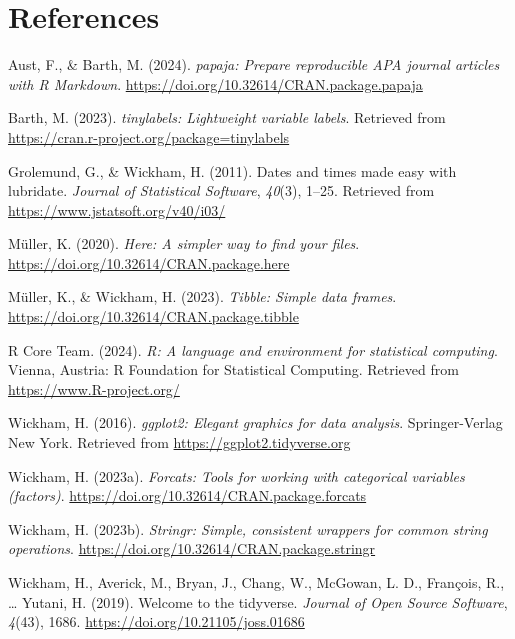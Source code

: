 \documentclass[
  ,man]{apa6}
\newlength{\cslhangindent}
\newenvironment{CSLReferences}[2] %
 {\begin{list}{}{%
  \setlength{\itemindent}{0pt}
  \setlength{\leftmargin}{0pt}
  \setlength{\parsep}{0pt}
  \ifodd #1
   \setlength{\leftmargin}{\cslhangindent}
   \setlength{\itemindent}{-1\cslhangindent}
  \fi
  \setlength{\itemsep}{#2\baselineskip}}}
 {\end{list}}
\begin{document}
\section{References}\label{references}

\setlength{\parindent}{-0.5in}
\setlength{\leftskip}{0.5in}

\label{refs}
\begin{CSLReferences}{1}{0}
Aust, F., \& Barth, M. (2024). \emph{{papaja}: {Prepare} reproducible {APA} journal articles with {R Markdown}}. \url{https://doi.org/10.32614/CRAN.package.papaja}

Barth, M. (2023). \emph{{tinylabels}: Lightweight variable labels}. Retrieved from \url{https://cran.r-project.org/package=tinylabels}

Grolemund, G., \& Wickham, H. (2011). Dates and times made easy with {lubridate}. \emph{Journal of Statistical Software}, \emph{40}(3), 1--25. Retrieved from \url{https://www.jstatsoft.org/v40/i03/}

Müller, K. (2020). \emph{Here: A simpler way to find your files}. \url{https://doi.org/10.32614/CRAN.package.here}

Müller, K., \& Wickham, H. (2023). \emph{Tibble: Simple data frames}. \url{https://doi.org/10.32614/CRAN.package.tibble}

R Core Team. (2024). \emph{R: A language and environment for statistical computing}. Vienna, Austria: R Foundation for Statistical Computing. Retrieved from \url{https://www.R-project.org/}

Wickham, H. (2016). \emph{ggplot2: Elegant graphics for data analysis}. Springer-Verlag New York. Retrieved from \url{https://ggplot2.tidyverse.org}

Wickham, H. (2023a). \emph{Forcats: Tools for working with categorical variables (factors)}. \url{https://doi.org/10.32614/CRAN.package.forcats}

Wickham, H. (2023b). \emph{Stringr: Simple, consistent wrappers for common string operations}. \url{https://doi.org/10.32614/CRAN.package.stringr}

Wickham, H., Averick, M., Bryan, J., Chang, W., McGowan, L. D., François, R., \ldots{} Yutani, H. (2019). Welcome to the {tidyverse}. \emph{Journal of Open Source Software}, \emph{4}(43), 1686. \url{https://doi.org/10.21105/joss.01686}


\end{CSLReferences}
\end{document}
